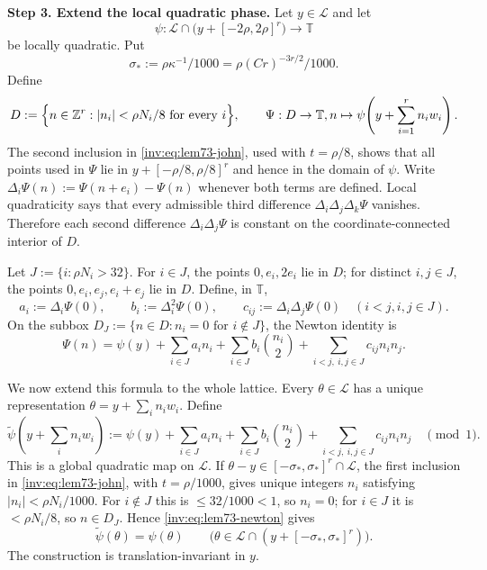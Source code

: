 \documentclass[twoside]{aomart}
\makeatletter
\theoremstyle{paperplain}
\theoremstyle{paperdefinition}
\renewenvironment{proof}[1][\proofname]{\par\pushQED{\qed}%
  \normalfont\topsep6\p@\@plus3\p@\relax\trivlist
  \item[\hskip\labelsep\itshape #1\@addpunct{.}]\ignorespaces
}{\popQED\endtrivlist\@endpefalse}
\numberwithin{equation}{section}
\makeatother
\begin{document}
\begin{proof}
\par
\medskip
\noindent\textbf{Step 3. Extend the local quadratic phase.}
Let $y\in\mathcal L$ and let
\[
 \psi:\mathcal L\cap\bigl(y+[-2\rho,2\rho]^r\bigr)\longrightarrow\mathbb T
\]
be locally quadratic.  Put
\[
 \sigma_*:=\rho\kappa^{-1}/1000=\rho(Cr)^{-3r/2}/1000.
\]
Define
\[
 D:=\Bigl\{n\in\mathbb Z^r:|n_i|<\rho N_i/8\ \text{for every }i\Bigr\},
 \qquad
 \Psi:D\to \mathbb T,n\mapsto\psi\!\left(y+\sum_{i=1}^rn_iw_i\right).
\]
The second inclusion in \eqref{inv:eq:lem73-john}, used with $t=\rho/8$,
shows that all points used in $\Psi$ lie in
$y+[-\rho/8,\rho/8]^r$ and hence in the domain of $\psi$.  Write
$\Delta_i\Psi(n):=\Psi(n+e_i)-\Psi(n)$ whenever both terms are
defined.  Local quadraticity says that every admissible third difference
$\Delta_i\Delta_j\Delta_k\Psi$ vanishes.  Therefore each second
difference $\Delta_i\Delta_j\Psi$ is constant on the coordinate-connected
interior of $D$.

Let $J:=\{i:\rho N_i>32\}$.  For $i\in J$, the points $0,e_i,2e_i$
lie in $D$; for distinct $i,j\in J$, the points
$0,e_i,e_j,e_i+e_j$ lie in $D$.  Define, in $\mathbb T$,
\[
 a_i:=\Delta_i\Psi(0),\qquad b_i:=\Delta_i^2\Psi(0),\qquad
 c_{ij}:=\Delta_i\Delta_j\Psi(0)\quad(i<j, i,j\in J).
\]
On the subbox
$D_J:=\{n\in D:n_i=0\text{ for }i\notin J\}$, the Newton identity is
\begin{equation}
 \Psi(n)=\psi(y)+\sum_{i\in J}a_in_i
       +\sum_{i\in J}b_i\binom{n_i}{2}
       +\sum_{i<j,\ i,j\in J}c_{ij}n_in_j.                         \label{inv:eq:lem73-newton}
\end{equation}

We now extend this formula to the whole lattice.  Every
$\theta\in\mathcal L$ has a unique representation
$\theta=y+\sum_i n_iw_i$.  Define
\[
 \widetilde\psi\!\left(y+\sum_i n_iw_i\right):=
 \psi(y)+\sum_{i\in J}a_in_i
       +\sum_{i\in J}b_i\binom{n_i}{2}
       +\sum_{i<j,\ i,j\in J}c_{ij}n_in_j
       \quad\pmod 1.
\]
This is a global quadratic map on $\mathcal L$.  If
$\theta-y\in[-\sigma_*,\sigma_*]^r\cap\mathcal L$, the first inclusion
in \eqref{inv:eq:lem73-john}, with $t=\rho/1000$, gives unique integers
$n_i$ satisfying $|n_i|<\rho N_i/1000$.  For $i\notin J$ this is
$\le 32/1000<1$, so $n_i=0$; for $i\in J$ it is $<\rho N_i/8$, so
$n\in D_J$.  Hence \eqref{inv:eq:lem73-newton} gives
\[
 \widetilde\psi(\theta)=\psi(\theta)\qquad
 \bigl(\theta\in\mathcal L\cap(y+[-\sigma_*,\sigma_*]^r)\bigr).
\]
The construction is translation-invariant in $y$.


\end{proof}
\end{document}
